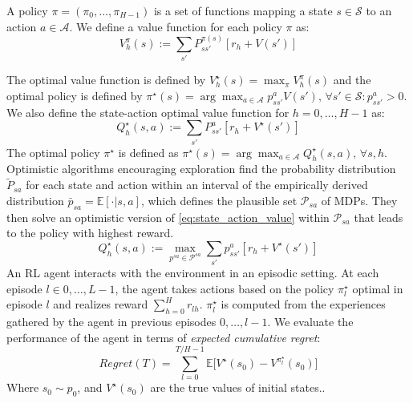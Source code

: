 \documentclass{article}
\newcommand{\E}{\mathbb{E}}
\newcommand{\opt}{^\star}
\newcommand{\states}{\mathcal{S}}
\newcommand{\actions}{\mathcal{A}}
\newcommand{\mdp}{\mathcal{M}}
\newcommand{\pset}{\mathcal{P}}
\theoremstyle{plain}
\theoremstyle{definition}
\begin{document}
A policy $\pi = (\pi_0,\ldots,\pi_{H-1})$ is a set of functions mapping a state $s\in\states$ to an action $a\in\actions$. We define a value function for each policy $\pi$ as:
\begin{equation} \label{eq:state_value}
V^\pi_h(s) := \sum_{s'} P^{\pi(s)}_{ss'} [ r_h + V(s') ]
\end{equation}

The optimal value function is defined by $V\opt_h(s) = \max_\pi V^\pi_h(s)$ and the optimal policy is defined by $\pi\opt(s) = \arg\max_{a\in\actions} p^a_{ss'}V(s') \text{, } \forall s'\in\states: p^a_{ss'}>0$. We also define the state-action optimal value function for $h=0,\ldots,H-1$ as:
\begin{equation} \label{eq:state_action_value}
Q\opt_h(s,a) := \sum_{s'}P^{a}_{ss'}[r_h + V\opt (s') ]
\end{equation}
The optimal policy $\pi\opt$ is defined as $\pi\opt(s) = \arg\max_{a\in\actions}Q\opt_h(s,a) \text{, } \forall s,h$. Optimistic algorithms encouraging exploration find the probability distribution $\tilde{P}_{sa}$ for each state and action within an interval of the empirically derived distribution $\bar{p}_{sa} = \E[\cdot|s,a]$, which defines the plausible set $\pset_{sa}$ of MDPs. They then solve an optimistic version
of \cref{eq:state_action_value} within $\pset_{sa}$ that leads to the policy with highest reward.
\begin{equation}
Q\opt_h(s,a) := \max_{p^{sa} \in \pset^{sa}} \sum_{s'}p^{a}_{ss'}[r_h + V\opt (s') ]
\end{equation}
An RL agent interacts with the environment in an episodic setting. At each episode $l\in 0,\ldots,L-1$, the agent takes actions based on the policy $\pi\opt_l$ optimal in episode $l$ and realizes reward $\sum_{h=0}^H r_{lh}$. $\pi\opt_l$ is computed from the experiences gathered by the agent in previous episodes $0,\ldots,l-1$. We evaluate the performance of the agent in terms of \emph{expected cumulative regret}:
\[
Regret(T) = \sum_{l=0}^{T/H-1} \E\bigg[ V\opt(s_0) - V^{\pi\opt_l}(s_0) \bigg]
\]
Where $s_0 \sim p_0$, and $V\opt(s_0)$ are the true values of initial states.. 
\end{document}
